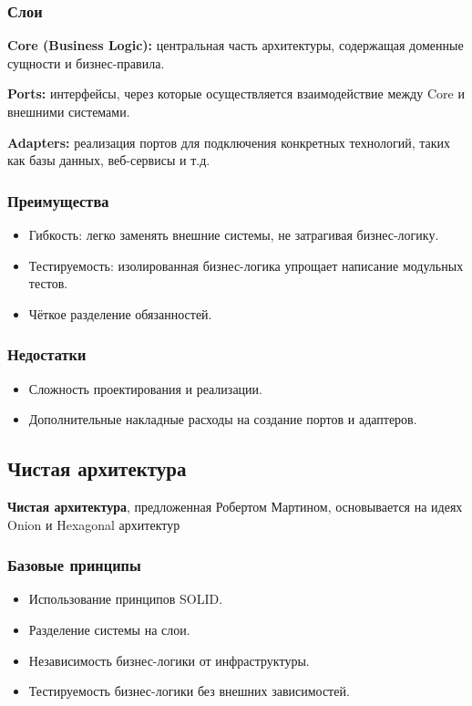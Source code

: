 \subsubsection{Слои}
\textbf{Core (Business Logic):} центральная часть архитектуры, содержащая доменные сущности и бизнес-правила.

\textbf{Ports:} интерфейсы, через которые осуществляется взаимодействие между Core и внешними системами.

\textbf{Adapters:} реализация портов для подключения конкретных технологий, таких как базы данных, веб-сервисы и т.д.

\subsubsection{Преимущества}
\begin{itemize}
    \item Гибкость: легко заменять внешние системы, не затрагивая бизнес-логику.
    \item Тестируемость: изолированная бизнес-логика упрощает написание модульных тестов.
    \item Чёткое разделение обязанностей.
\end{itemize}

\subsubsection{Недостатки}
\begin{itemize}
    \item Сложность проектирования и реализации.
    \item Дополнительные накладные расходы на создание портов и адаптеров.
\end{itemize}

\subsection{Чистая архитектура}
\textbf{Чистая архитектура}, предложенная Робертом Мартином, основывается на идеях Onion и Hexagonal архитектур\cite{martin2017clean}

\subsubsection{Базовые принципы}
\begin{itemize}
    \item Использование принципов SOLID.
    \item Разделение системы на слои.
    \item Независимость бизнес-логики от инфраструктуры.
    \item Тестируемость бизнес-логики без внешних зависимостей.
\end{itemize}

